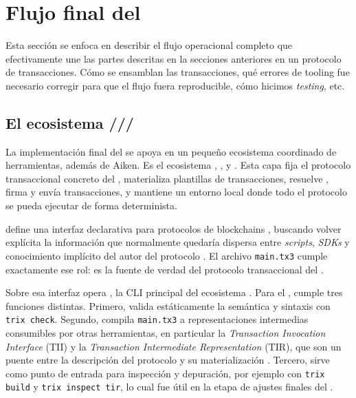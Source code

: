 
\section{Flujo final del \zkBridge}

Esta sección se enfoca en describir el flujo operacional completo que efectivamente une las partes descritas en la secciones anteriores en un protocolo de transacciones. Cómo se ensamblan las transacciones, qué errores de tooling fue necesario corregir para que el flujo fuera reproducible, cómo hicimos \textit{testing}, etc.

\subsection{El ecosistema \texorpdfstring{\TxThree/\Trix/\CShell/\Dolos}{Tx3/Trix/cshell/dolos}}

La implementación final del \zkBridge se apoya en un pequeño ecosistema coordinado de herramientas, además de Aiken. Es el ecosistema \TxThree, \Trix, \CShell y \Dolos. Esta capa fija el protocolo transaccional concreto del \zkBridge, materializa plantillas de transacciones, resuelve \UTxOs, firma y envía transacciones, y mantiene un entorno local donde todo el protocolo se pueda ejecutar de forma determinista.

\TxThree define una interfaz declarativa para protocolos de blockchains \UTxO, buscando volver explícita la información \Offchain que normalmente quedaría dispersa entre \textit{scripts}, \textit{SDKs} y conocimiento implícito del autor del protocolo \cite{Tx3DocsIntroduction}. El archivo \texttt{main.tx3} cumple exactamente ese rol: es la fuente de verdad del protocolo transaccional del \zkBridge.

Sobre esa interfaz opera \Trix, la CLI principal del ecosistema \TxThree \cite{Tx3DocsTrix}. Para el \zkBridge, \Trix cumple tres funciones distintas. Primero, valida estáticamente la semántica y sintaxis con \texttt{trix check}. Segundo, compila \texttt{main.tx3} a representaciones intermedias consumibles por otras herramientas, en particular la \textit{Transaction Invocation Interface} (TII) y la \textit{Transaction Intermediate Representation} (TIR), que son un puente entre la descripción del protocolo y su materialización \cite{Tx3DocsIntroduction,Tx3DocsTrix}. Tercero, sirve como punto de entrada para inspección y depuración, por ejemplo con \texttt{trix build} y \texttt{trix inspect tir}, lo cual fue útil en la etapa de ajustes finales del \zkBridge.

